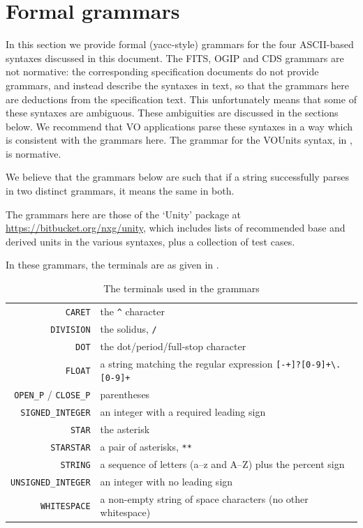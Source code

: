 \documentclass[12pt,notitlepage,onecolumn]{ivoa}
\begin{document}
\appendix

\section{Formal grammars\label{sec:grammar}}

In this section we provide formal (yacc-style) grammars for the four
ASCII-based syntaxes discussed in this document.  The FITS, OGIP and
CDS grammars are not normative: the corresponding specification
documents do not provide grammars, and instead describe the syntaxes
in text, so that the grammars here are deductions from the
specification text.
This unfortunately means that some of these syntaxes are ambiguous.
These ambiguities are discussed in the sections below.  We recommend
that VO applications parse these syntaxes in a way which is consistent
with the grammars here.
%
The grammar for the VOUnits syntax, in , is normative.

We believe that the grammars below are such that if a string 
successfully parses in two distinct grammars, it means the same in
both.

The grammars here are those of the `Unity' package at
\url{https://bitbucket.org/nxg/unity}, which includes lists of
recommended base and derived units in the various syntaxes, plus a
collection of test cases.

In these grammars, the terminals are as given in
.
\begin{table}
\begin{tabular}{rp{9cm}}
\texttt{CARET}&the \texttt{\^{}} character\tabularnewline
\texttt{DIVISION}&the solidus, \texttt{/}\tabularnewline
\texttt{DOT}&the dot/period/full-stop character\tabularnewline
\texttt{FLOAT}&a string matching the regular expression
       \texttt{[-+]?[0-9]+\textbackslash.[0-9]+}\raggedright\tabularnewline
\texttt{OPEN\_P} / \texttt{CLOSE\_P}&parentheses\tabularnewline
\texttt{SIGNED\_INTEGER}&an integer with a required leading sign\raggedright\tabularnewline
\texttt{STAR}&the asterisk\tabularnewline
\texttt{STARSTAR}&a pair of asterisks, \texttt{**}\tabularnewline
\texttt{STRING}&a sequence of letters (a--z and A--Z) plus the percent sign\raggedright\tabularnewline
\texttt{UNSIGNED\_INTEGER}&an integer with no leading sign\raggedright\tabularnewline
\texttt{WHITESPACE}&a non-empty string of space characters (no other whitespace)\raggedright\tabularnewline
\end{tabular}
\caption{\label{tabx:terminals}The terminals used in the grammars}
\end{table}
\end{document}
